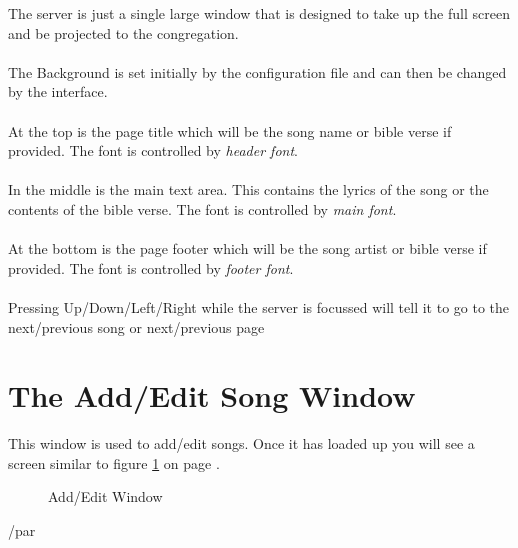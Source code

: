 \documentclass[11pt,twoside]{book}
\begin{document}
	The server is just a single large window that is designed to take up the full screen and be projected to the congregation.\\
	\\
	The Background is set initially by the configuration file and can then be changed by the interface.\\
	\\
	At the top is the page title which will be the song name or bible verse if provided.  The font is controlled by \emph{header font}.\\
	\\
	In the middle is the main text area. This contains the lyrics of the song or the contents of the bible verse. The font is controlled by \emph{main font}.\\
	\\
	At the bottom is the page footer which will be the song artist or bible verse if provided.  The font is controlled by \emph{footer font}.\\
	\\
	Pressing Up/Down/Left/Right while the server is focussed will tell it to go to the next/previous song or next/previous page\\


\section{The Add/Edit Song Window}

This window is used to add/edit songs.  Once it has loaded up you will see a screen similar to figure \ref{figure:add} on page \pageref{figure:add}.

{ \begin{figure}
\caption{\label{figure:add}Add/Edit Window}
\end{figure}
/par}
\end{document}
